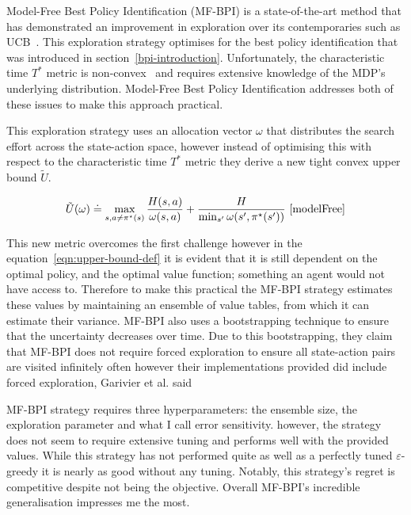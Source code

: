 \documentclass[]{final_report}
\begin{document}
Model-Free Best Policy Identification (MF-BPI) is a state-of-the-art method that has demonstrated an improvement in exploration over its contemporaries such as UCB~\cite{modelFree}. This exploration strategy optimises for the best policy identification that was introduced in section~\ref{bpi-introduction}. Unfortunately, the characteristic time $T^*$ metric is non-convex~\cite{characteristicTimeNonConvex} and requires extensive knowledge of the MDP's underlying distribution. Model-Free Best Policy Identification addresses both of these issues to make this approach practical.

This exploration strategy uses an allocation vector $\omega$ that distributes the search effort across the state-action space, however instead of optimising this with respect to the characteristic time $T^*$ metric they derive a new tight convex upper bound $\tilde{U}$. 

\begin{equation}
  \tilde{U}(\omega) \doteq \max_{s,a \neq \pi^\star(s)} \frac{H(s,a)}{\omega(s,a)} + \frac{H}{\min_{s'} \omega(s',\pi^\star(s'))}~\cite{modelFree} \label{eqn:upper-bound-def}
\end{equation}


This new metric overcomes the first challenge however in the equation~\ref{eqn:upper-bound-def} it is evident that it is still dependent on the optimal policy, and the optimal value function; something an agent would not have access to. Therefore to make this practical the MF-BPI strategy estimates these values by maintaining an ensemble of value tables, from which it can estimate their variance. MF-BPI also uses a bootstrapping technique to ensure that the uncertainty decreases over time. Due to this bootstrapping, they claim that MF-BPI does not require forced exploration to ensure all state-action pairs are visited infinitely often however their implementations provided did include forced exploration, Garivier et al. said ~\cite{characteristicTime}

MF-BPI strategy requires three hyperparameters: the ensemble size, the exploration parameter and what I call error sensitivity. however, the strategy does not seem to require extensive tuning and performs well with the provided values. While this strategy has not performed quite as well as a perfectly tuned $\varepsilon$-greedy it is nearly as good without any tuning. Notably, this strategy's regret is competitive despite not being the objective. Overall MF-BPI's incredible generalisation impresses me the most.
\end{document}

